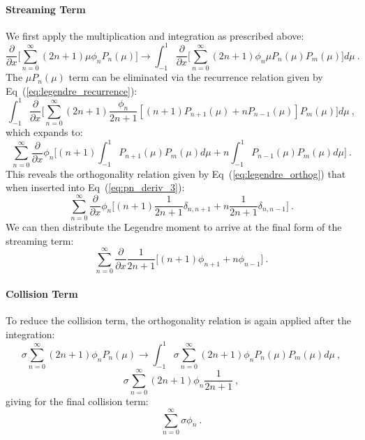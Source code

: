 \paragraph{Streaming Term}
We first apply the multiplication and integration as prescribed above:
\begin{equation}
  \frac{\partial}{\partial x}\Bigg[\sum_{n=0}^\infty (2n+1) \mu \phi_n
    P_n(\mu) \Bigg] \rightarrow \int_{-1}^1 \frac{\partial}{\partial
    x}\Bigg[\sum_{n=0}^\infty (2n+1) \phi_n \mu P_n(\mu) P_m(\mu) \Bigg]
  d \mu\:.
  \label{eq:pn_deriv_2}
\end{equation}
The $\mu P_n(\mu)$ term can be eliminated via the recurrence relation
given by Eq~(\ref{eq:legendre_recurrence}):
\begin{equation}
\int_{-1}^1 \frac{\partial}{\partial x}\Bigg[\sum_{n=0}^\infty (2n+1)
  \frac{\phi_n}{2n+1}[(n+1)P_{n+1}(\mu) + n P_{n-1}(\mu)] P_m(\mu)
  \Bigg] d\mu\:,
\label{eq:pn_deriv_3}
\end{equation}
which expands to:
\begin{equation}
  \sum_{n=0}^\infty \frac{\partial}{\partial
    x}\phi_n\Bigg[(n+1)\int_{-1}^1 P_{n+1}(\mu)P_m(\mu) d\mu + n
    \int_{-1}^1 P_{n-1}(\mu) P_m(\mu) d\mu \Bigg] \:.
  \label{eq:pn_deriv_4}
\end{equation}
This reveals the orthogonality relation given by
Eq~(\ref{eq:legendre_orthog}) that when inserted into
Eq~(\ref{eq:pn_deriv_3}):
\begin{equation}
  \sum_{n=0}^\infty \frac{\partial}{\partial
    x}\phi_n\Bigg[(n+1)\frac{1}{2n+1}\delta_{n,n+1} +
    n\frac{1}{2n+1}\delta_{n,n-1} \Bigg] \:.
  \label{eq:pn_deriv_5}
\end{equation}
We can then distribute the Legendre moment to arrive at the final form
of the streaming term:
\begin{equation}
  \sum_{n=0}^\infty \frac{\partial}{\partial x} \frac{1}{2n+1} \Big[
    (n+1) \phi_{n+1} + n \phi_{n-1} \Big] \:.
  \label{eq:pn_deriv_6}
\end{equation}

\paragraph{Collision Term}
To reduce the collision term, the orthogonality relation is again
applied after the integration:
\begin{equation}
  \sigma \sum_{n=0}^\infty (2n+1) \phi_n P_n(\mu) \rightarrow
  \int_{-1}^1 \sigma \sum_{n=0}^\infty (2n+1) \phi_n P_n(\mu) P_m(\mu)
  d\mu\:,
  \label{eq:pn_deriv_7}
\end{equation}
\begin{equation}
  \sigma \sum_{n=0}^\infty (2n+1) \phi_n \frac{1}{2n+1}\:,
  \label{eq:pn_deriv_8}
\end{equation}
giving for the final collision term:
\begin{equation}
  \sum_{n=0}^\infty \sigma \phi_n \:.
  \label{eq:pn_deriv_9}
\end{equation}

